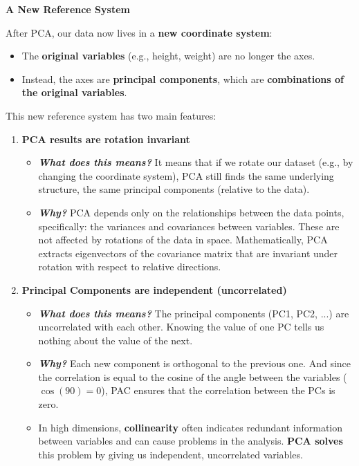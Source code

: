 \highspace
\begin{flushleft}
    \textcolor{Green3}{ \textbf{A New Reference System}}
\end{flushleft}
After PCA, our data now lives in a \textbf{new coordinate system}:
\begin{itemize}
    \item The \textbf{original variables} (e.g., height, weight) are no longer the axes.
    \item Instead, the axes are \textbf{principal components}, which are \textbf{combinations of the original variables}.
\end{itemize}
This new reference system has two main features:
\begin{enumerate}
    \item \textbf{PCA results are rotation invariant}
    \begin{itemize}
        \item[\textcolor{Green3}{\faIcon{book}}] \textcolor{Green3}{\textbf{\emph{What does this means?}}} It means that if we rotate our dataset (e.g., by changing the coordinate system), PCA still finds the same underlying structure, the same principal components (relative to the data).

        \item[\textcolor{Green3}{\faIcon{question-circle}}] \textcolor{Green3}{\textbf{\emph{Why?}}} PCA depends only on the relationships between the data points, specifically: the variances and covariances between variables. These are not affected by rotations of the data in space. Mathematically, PCA extracts eigenvectors of the covariance matrix that are invariant under rotation with respect to relative directions.
    \end{itemize}

    \item \textbf{Principal Components are independent (uncorrelated)}
    \begin{itemize}
        \item[\textcolor{Green3}{\faIcon{book}}] \textcolor{Green3}{\textbf{\emph{What does this means?}}} The principal components (PC1, PC2, ...) are uncorrelated with each other. Knowing the value of one PC tells us nothing about the value of the next.

        \item[\textcolor{Green3}{\faIcon{question-circle}}] \textcolor{Green3}{\textbf{\emph{Why?}}} Each new component is orthogonal to the previous one. And since the correlation is equal to the cosine of the angle between the variables ($\cos(90) = 0$), PAC ensures that the correlation between the PCs is zero.
        
        \item[\textcolor{Green3}{\faIcon{check}}] In high dimensions, \textbf{collinearity} often indicates redundant information between variables and can cause problems in the analysis. \textbf{PCA solves} this problem by giving us independent, uncorrelated variables.
    \end{itemize}
\end{enumerate}

